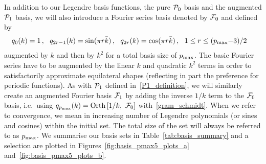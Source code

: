 In addition to our Legendre basis functions, the pure $\mathcal{P}_0$ basis and
the augmented $\mathcal{P}_1$ basis, we will also introduce a Fourier series basis denoted by $\mathcal{F}_0$ and defined by
\begin{align}\label{F0_definition}
    &q_{0}(k)    = 1\,, ~~
    q_{2r-1}(k)   = \sin(\pi r\bar{k})\,,  ~~
    q_{2r}(k) = \cos(\pi r\bar{k})\,,  ~~  1\leq r\leq(p_\text{max}\text{$-$}3)/2
\end{align}
augmented by $k$ and then by $k^2$ for a total basis size of $p_\text{max}$.
The basic Fourier series have to be augmented by the linear $k$ and quadratic $k^2$ terms
in order to satisfactorily approximate equilateral shapes (reflecting in part the preference for periodic functions). 
As with $\mathcal{P}_1$ defined in~\eqref{P1_definition}, we will similarly create an augmented Fourier basis $\mathcal{F}_1$
by adding the inverse $1/k$ term to the $\mathcal{F}_0$ basis, i.e.\ using
$q_{p_{\rm max}}(k) = \text{Orth}\left[{1}/ {k},~\mathcal{F}_0\right]$ with~\eqref{gram_schmidt}.
When we refer to convergence, we mean in increasing number
of Legendre polynomials (or sines and cosines) within the initial set.
The total size of the set will always be referred to as $p_\text{max}$.
We summarise our basis sets in Table~\ref{tab:basis_summary}
and a selection are plotted in Figures~\ref{fig:basis_pmax5_plots_a}
and~\ref{fig:basis_pmax5_plots_b}.

